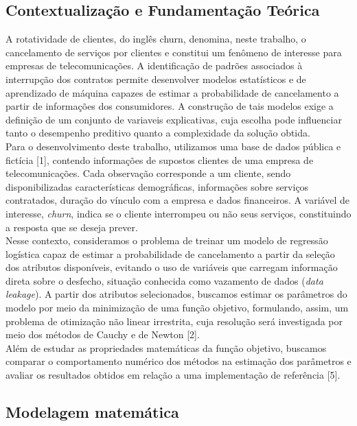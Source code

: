 \documentclass{article}
\theoremstyle{remark}
\begin{document}
\subsection{Contextualização e Fundamentação Teórica}

A rotatividade de clientes, do inglês churn, denomina, neste trabalho, o cancelamento de serviços por clientes e constitui um fenômeno de interesse para empresas de telecomunicações. A identificação de padrões associados à interrupção dos contratos permite desenvolver modelos estatísticos e de aprendizado de máquina capazes de estimar a probabilidade de cancelamento a partir de informações dos consumidores. A construção de tais modelos exige a definição de um conjunto de variaveis explicativas, cuja escolha pode influenciar tanto o desempenho preditivo quanto a complexidade da solução obtida. \\

Para o desenvolvimento deste trabalho, utilizamos uma base de dados pública e fictícia [1], contendo informações de supostos clientes de uma empresa de telecomunicações. Cada observação corresponde a um cliente, sendo disponibilizadas características demográficas, informações sobre serviços contratados, duração do vínculo com a empresa e dados financeiros. A variável de interesse, \textit{churn}, indica se o cliente interrompeu ou não seus serviços, constituindo a resposta que se deseja prever. \\

Nesse contexto, consideramos o problema de treinar um modelo de regressão logística capaz de estimar a probabilidade de cancelamento a partir da seleção dos atributos disponíveis, evitando o uso de variáveis que carregam informação direta sobre o desfecho, situação conhecida como vazamento de dados (\textit{data leakage}). A partir dos atributos selecionados, buscamos estimar os parâmetros do modelo por meio da minimização de uma função objetivo, formulando, assim, um problema de otimização não linear irrestrita, cuja resolução será investigada por meio dos métodos de Cauchy e de Newton [2]. \\

Além de estudar as propriedades matemáticas da função objetivo, buscamos comparar o comportamento numérico dos métodos na estimação dos parâmetros e avaliar os resultados obtidos em relação a uma implementação de referência [5].

\subsection{Modelagem matemática}\label{subsec:modelagem}
\end{document}
